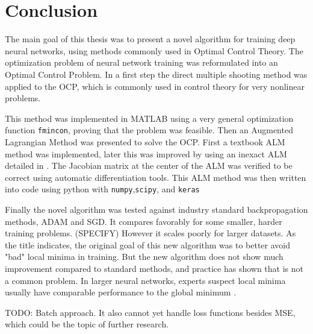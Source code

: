 \chapter{Conclusion}
\label{cha:conclusion}
The main goal of this thesis was to present a novel algorithm for training deep neural networks, using methods commonly used in Optimal Control Theory. The optimization problem of neural network training was reformulated into an Optimal Control Problem. In a first step the direct multiple shooting method was applied to the OCP, which is commonly used in control theory for very nonlinear problems. 

This method was implemented in MATLAB using a very general optimization function \texttt{fmincon}, proving that the problem was feasible. Then an Augmented Lagrangian Method was presented to solve the OCP. First a textbook ALM method was implemented, later this was improved by using an inexact ALM detailed in \cite{}. The Jacobian matrix at the center of the ALM was verified to be correct using automatic differentiation tools. This ALM method was then written into code using python with \texttt{numpy},\texttt{scipy}, and \texttt{keras}

Finally the novel algorithm was tested against industry standard backpropagation methods, ADAM and SGD. It compares favorably for some smaller, harder training problems. (SPECIFY) However it scales poorly for larger datasets. As the title indicates, the original goal of this new algorithm was to better avoid "bad" local minima in training. But the new algorithm does not show much improvement compared to standard methods, and practice has shown that is not a common problem. In larger neural networks, experts suspect local minima usually have comparable performance to the global minimum \cite{Goodfellow-et-al-2016}.  


TODO: Batch approach. It also cannot yet handle loss functions besides MSE, which could be the topic of further research.





